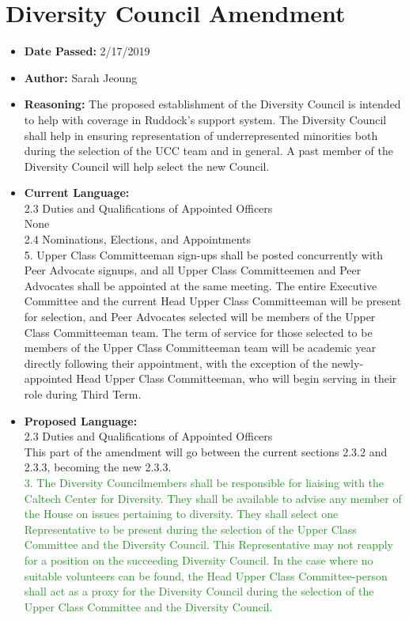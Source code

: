 \documentclass[10pt]{article} %
\begin{document}
\section{Diversity Council Amendment}
\begin{itemize}
	\item \textbf{Date Passed:} 2/17/2019
	\item \textbf{Author:} Sarah Jeoung
	\item \textbf{Reasoning:} The proposed establishment of the Diversity Council is intended to help with coverage in Ruddock’s support system. The Diversity Council shall help in ensuring representation of underrepresented minorities both during the selection of the UCC team and in general. A past member of the Diversity Council will help select the new Council. 
	\item \textbf{Current Language:} \\
	2.3 Duties and Qualifications of Appointed Officers \\
	None \\
	2.4 Nominations, Elections, and Appointments \\
	5. Upper Class Committeeman sign-ups shall be posted concurrently with Peer Advocate signups, and all Upper Class Committeemen and Peer Advocates shall be appointed at the same meeting. The entire Executive Committee and the current Head Upper Class Committeeman will be present for selection, and Peer Advocates selected will be members of the Upper Class Committeeman team. The term of service for those selected to be members of the Upper Class Committeeman team will be academic year directly following their appointment, with the exception of the newly-appointed Head Upper Class Committeeman, who will begin serving in their role during Third Term. 
	\item \textbf{Proposed Language:} \\
	2.3 Duties and Qualifications of Appointed Officers \\
	This part of the amendment will go between the current sections 2.3.2 and 2.3.3, becoming the new 2.3.3. \\
	\textcolor{ForestGreen}{3. The Diversity Councilmembers shall be responsible for liaising with the Caltech Center for Diversity. They shall be available to advise any member of the House on issues pertaining to diversity. They shall select one Representative to be present during the selection of the Upper Class Committee and the Diversity Council. This Representative may not reapply for a position on the succeeding Diversity Council. In the case where no suitable volunteers can be found, the Head Upper Class Committee-person shall act as a proxy for the Diversity Council during the selection of the Upper Class Committee and the Diversity Council.} \\

\end{itemize}
\end{document}
